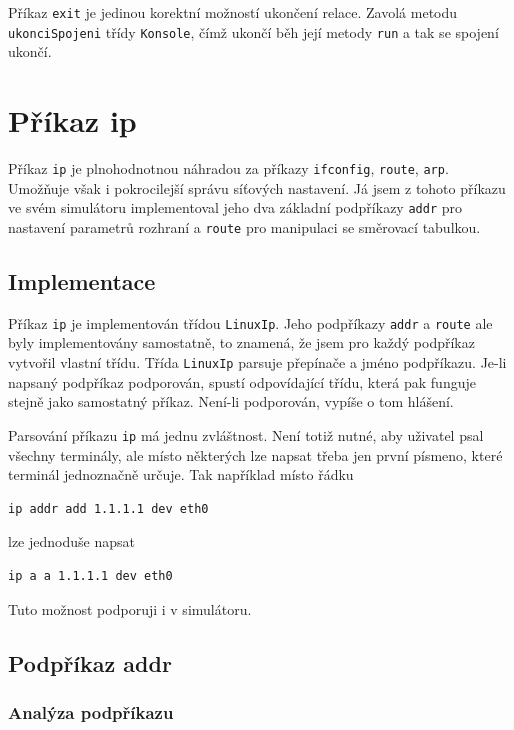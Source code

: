 Příkaz \verb|exit| je jedinou korektní možností ukončení relace. Zavolá metodu \verb|ukonciSpojeni| třídy \verb|Konsole|, čímž ukončí běh její metody \verb|run| a tak se spojení ukončí.




\section{Příkaz ip}

Příkaz \verb|ip| je plnohodnotnou náhradou za příkazy \verb|ifconfig|, \verb|route|, \verb|arp|. Umožňuje však i pokrocilejší správu síťových nastavení\cite{prikaz_ip}. Já jsem z tohoto příkazu ve svém simulátoru implementoval jeho dva základní podpříkazy \verb|addr| pro nastavení parametrů rozhraní a \verb|route| pro manipulaci se směrovací tabulkou. 


\subsection{Implementace}

Příkaz \verb|ip| je implementován třídou \verb|LinuxIp|. Jeho podpříkazy \verb|addr| a \verb|route| ale byly implementovány samostatně, to znamená, že jsem pro každý podpříkaz vytvořil vlastní třídu. Třída \verb|LinuxIp| parsuje přepínače a jméno podpříkazu. Je-li napsaný podpříkaz podporován, spustí odpovídající třídu, která pak funguje stejně jako samostatný příkaz. Není-li podporován, vypíše o tom hlášení. 

Parsování příkazu \verb|ip| má jednu zvláštnost. Není totiž nutné, aby uživatel psal všechny terminály, ale místo některých lze napsat třeba jen první písmeno, které terminál jednoznačně určuje. Tak například místo řádku
\begin{verbatim}
ip addr add 1.1.1.1 dev eth0
\end{verbatim}
lze jednoduše napsat
\begin{verbatim}
ip a a 1.1.1.1 dev eth0
\end{verbatim}
Tuto možnost podporuji i v simulátoru.


\subsection{Podpříkaz addr}

\subsubsection{Analýza podpříkazu}

